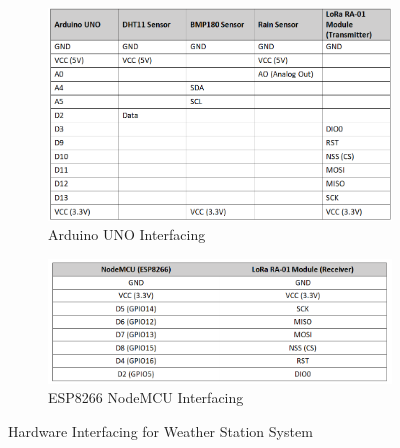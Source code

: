 \documentclass[conference, onecolumn]{IEEEtran}
\begin{document}
\begin{figure}[H]
    \centering
    \begin{subfigure}{0.45\textwidth}
        \centering
        \includegraphics[width=\linewidth]{figures/Screenshot 2025-03-01 154513.png}
        \caption{Arduino UNO Interfacing}
        \label{fig:arduino_interfacing}
    \end{subfigure}
    \hfill
    \begin{subfigure}{0.45\textwidth}
        \centering
        \includegraphics[width=\linewidth]{figures/Screenshot 2025-03-01 154646.png}
        \caption{ESP8266 NodeMCU Interfacing}
        \label{fig:esp8266_interfacing}
    \end{subfigure}
    \caption{Hardware Interfacing for Weather Station System}
    \label{fig:weather_station_interfacing}
\end{figure}
\end{document}
